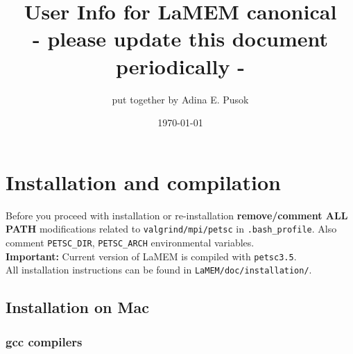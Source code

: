 \documentclass[a4paper,11pt]{article}
\title{User Info for LaMEM canonical\\ \large - please update this document periodically -}
\date{\today}
\author{put together by Adina E. Pusok}
\begin{document}
\maketitle
\tableofcontents

\newpage

\pagestyle{fancyplain}
\rhead[\fancyplain{}{\slshape \rightmark}]{\thepage}
\lhead[\thepage]{\fancyplain{}%
{\slshape \leftmark}}
\cfoot{}


\section{Installation and compilation}
Before you proceed with installation or re-installation \textbf{remove/comment ALL PATH} modifications related to \texttt{valgrind/mpi/petsc} in \texttt{.bash\_profile}.
Also comment \texttt{PETSC\_DIR}, \texttt{PETSC\_ARCH} environmental variables.\\

\textbf{Important:} Current version of LaMEM is compiled with \texttt{petsc3.5}.\\

All installation instructions can be found in \texttt{LaMEM/doc/installation/}. \\

\subsection{Installation on Mac}

\subsubsection{gcc compilers}
\end{document}
